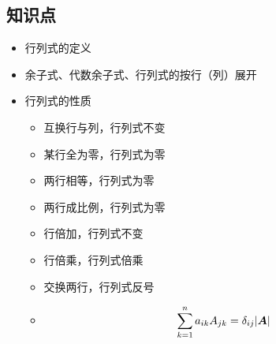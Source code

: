 \subsection{知识点}

\begin{frame}
  
    \begin{itemize}
    \item 行列式的定义
    \item[] 余子式、代数余子式、行列式的按行（列）展开
    \end{itemize}
  
\end{frame}


\begin{frame}
  
    \begin{itemize}
    \item 行列式的性质
      \begin{itemize}
      \item 互换行与列，行列式不变
      \item 某行全为零，行列式为零
      \item 两行相等，行列式为零
      \item 两行成比例，行列式为零
      \item 行倍加，行列式不变
      \item 行倍乘，行列式倍乘
      \item 交换两行，行列式反号
      \item
        $$
        \sum_{k=1}^n a_{ik}A_{jk}=\delta_{ij}|\boldsymbol{A}|
        $$
      \end{itemize}
    \end{itemize}
  
\end{frame}


